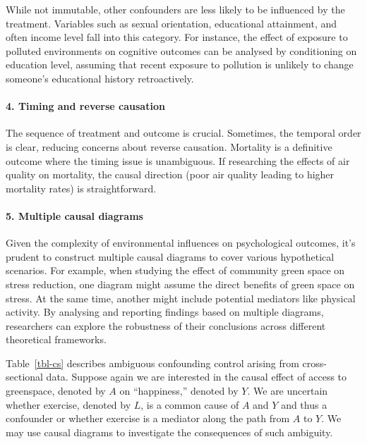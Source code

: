 \documentclass[
  singlecolumn]{article}
\let\oldparagraph\paragraph
\renewcommand{\paragraph}[1]{\oldparagraph{#1}\mbox{}}
\begin{document}
While not immutable, other confounders are less likely to be influenced
by the treatment. Variables such as sexual orientation, educational
attainment, and often income level fall into this category. For
instance, the effect of exposure to polluted environments on cognitive
outcomes can be analysed by conditioning on education level, assuming
that recent exposure to pollution is unlikely to change someone's
educational history retroactively.

\paragraph{\texorpdfstring{4. \textbf{Timing and reverse
causation}}{4. Timing and reverse causation}}\label{timing-and-reverse-causation}

The sequence of treatment and outcome is crucial. Sometimes, the
temporal order is clear, reducing concerns about reverse causation.
Mortality is a definitive outcome where the timing issue is unambiguous.
If researching the effects of air quality on mortality, the causal
direction (poor air quality leading to higher mortality rates) is
straightforward.

\paragraph{\texorpdfstring{5. \textbf{Multiple causal
diagrams}}{5. Multiple causal diagrams}}\label{multiple-causal-diagrams}

Given the complexity of environmental influences on psychological
outcomes, it's prudent to construct multiple causal diagrams to cover
various hypothetical scenarios. For example, when studying the effect of
community green space on stress reduction, one diagram might assume the
direct benefits of green space on stress. At the same time, another
might include potential mediators like physical activity. By analysing
and reporting findings based on multiple diagrams, researchers can
explore the robustness of their conclusions across different theoretical
frameworks.

Table~\ref{tbl-cs} describes ambiguous confounding control arising from
cross-sectional data. Suppose again we are interested in the causal
effect of access to greenspace, denoted by \(A\) on ``happiness,''
denoted by \(Y\). We are uncertain whether exercise, denoted by \(L\),
is a common cause of \(A\) and \(Y\) and thus a confounder or whether
exercise is a mediator along the path from \(A\) to \(Y\). We may use
causal diagrams to investigate the consequences of such ambiguity.
\end{document}
